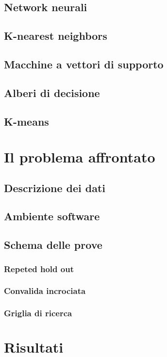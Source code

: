 \documentclass[a4paper,12pt]{report}
\begin{document}
\section{Network neurali}
\section{K-nearest neighbors}
\section{Macchine a vettori di supporto}
\section{Alberi di decisione}
\section{K-means}

% 
% 
\chapter{Il problema affrontato}
\label{cap2}
\section{Descrizione dei dati}
\section{Ambiente software}
\section{Schema delle prove}
\subsection{Repeted hold out}
\subsection{Convalida incrociata}
\subsection{Griglia di ricerca}


% 
% 
\chapter{Risultati}
\label{cap3}
\end{document}
